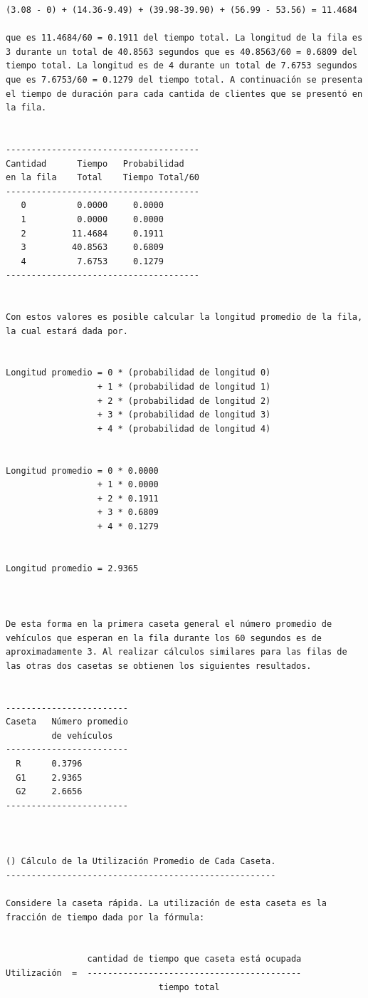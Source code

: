 \begin{verbatim}
(3.08 - 0) + (14.36-9.49) + (39.98-39.90) + (56.99 - 53.56) = 11.4684

que es 11.4684/60 = 0.1911 del tiempo total. La longitud de la fila es 3 durante un total de 40.8563 segundos que es 40.8563/60 = 0.6809 del tiempo total. La longitud es de 4 durante un total de 7.6753 segundos que es 7.6753/60 = 0.1279 del tiempo total. A continuación se presenta el tiempo de duración para cada cantida de clientes que se presentó en la fila.


--------------------------------------
Cantidad      Tiempo   Probabilidad
en la fila    Total    Tiempo Total/60
--------------------------------------
   0          0.0000     0.0000
   1          0.0000     0.0000
   2         11.4684     0.1911
   3         40.8563     0.6809
   4          7.6753     0.1279
--------------------------------------


Con estos valores es posible calcular la longitud promedio de la fila, la cual estará dada por.


Longitud promedio = 0 * (probabilidad de longitud 0)
                  + 1 * (probabilidad de longitud 1)
                  + 2 * (probabilidad de longitud 2)
                  + 3 * (probabilidad de longitud 3)
                  + 4 * (probabilidad de longitud 4)


Longitud promedio = 0 * 0.0000
                  + 1 * 0.0000
                  + 2 * 0.1911
                  + 3 * 0.6809
                  + 4 * 0.1279


Longitud promedio = 2.9365



De esta forma en la primera caseta general el número promedio de vehículos que esperan en la fila durante los 60 segundos es de aproximadamente 3. Al realizar cálculos similares para las filas de las otras dos casetas se obtienen los siguientes resultados.


------------------------
Caseta   Número promedio
         de vehículos
------------------------
  R      0.3796
  G1     2.9365
  G2     2.6656
------------------------



() Cálculo de la Utilización Promedio de Cada Caseta.
-----------------------------------------------------

Considere la caseta rápida. La utilización de esta caseta es la fracción de tiempo dada por la fórmula:


                cantidad de tiempo que caseta está ocupada
Utilización  =  ------------------------------------------
                              tiempo total



\end{verbatim}
